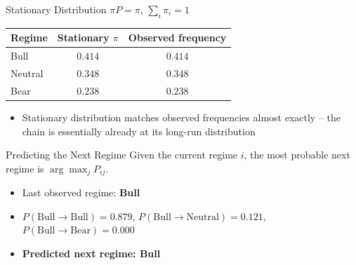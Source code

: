 \documentclass{beamer}
\begin{document}
\begin{frame}{Stationary Distribution}
    $\pi P = \pi$, $\sum_i \pi_i = 1$
    \begin{table}
        \centering
        \begin{tabular}{lcc}
            \toprule
            Regime & Stationary $\pi$ & Observed frequency \\
            \midrule
            Bull    & $0.414$ & $0.414$ \\
            Neutral & $0.348$ & $0.348$ \\
            Bear    & $0.238$ & $0.238$ \\
            \bottomrule
        \end{tabular}
    \end{table}
    \begin{itemize}
        \item Stationary distribution matches observed frequencies almost exactly --
              the chain is essentially already at its long-run distribution
    \end{itemize}
\end{frame}

\begin{frame}{Predicting the Next Regime}
    Given the current regime $i$, the most probable next regime is $\arg\max_j P_{ij}$.
    \begin{itemize}
        \item Last observed regime: \textbf{Bull}
        \item $P(\text{Bull} \to \text{Bull}) = 0.879$, \quad
              $P(\text{Bull} \to \text{Neutral}) = 0.121$, \quad
              $P(\text{Bull} \to \text{Bear}) = 0.000$
        \item \textbf{Predicted next regime: Bull}
    \end{itemize}
\end{frame}
\end{document}
